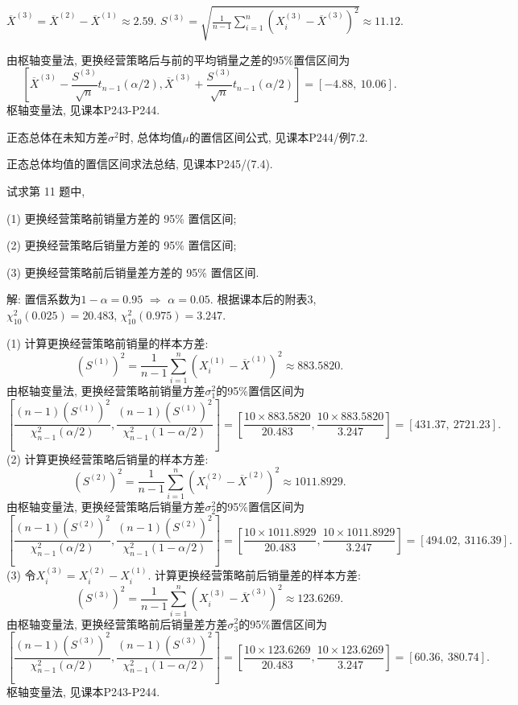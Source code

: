 \documentclass[standard]{ExBook}
\renewenvironment{shaded}{%
  \def\FrameCommand{\fboxsep=\FrameSep \colorbox{shadecolor}}%
  \MakeFramed{\advance\hsize-\width \FrameRestore}%
}{%
  \endMakeFramed
}
\begin{document}
\begin{qitems}
$\overline{X}^{(3)}=\overline{X}^{(2)}-\overline{X}^{(1)}\approx2.59$. 
$S^{(3)}=\sqrt{\frac{1}{n-1}\sum_{i=1}^n(X_i^{(3)}-\overline{X}^{(3)})^2}\approx11.12$.

由枢轴变量法, 更换经营策略后与前的平均销量之差的95\%置信区间为
$$
\left[
\overline{X}^{(3)}-\frac{S^{(3)}}{\sqrt{n}}t_{n-1}(\alpha/2),
\overline{X}^{(3)}+\frac{S^{(3)}}{\sqrt{n}}t_{n-1}(\alpha/2)
\right]
=
[-4.88,\ 10.06].
$$
\textcolor{themeColor}{\selectfont {} 枢轴变量法, 见课本P243-P244.}

\textcolor{themeColor}{\selectfont {}
正态总体在未知方差$\sigma^2$时, 总体均值$\mu$的置信区间公式, 见课本P244/例7.2.}

\textcolor{themeColor}{\selectfont {} 正态总体均值的置信区间求法总结, 见课本P245/(7.4).}

\vspace{2.5cm-5em}

    \begin{bbox}
    \begin{shaded}
        \qitem
试求第 11 题中,

(1) 更换经营策略前销量方差的 95\% 置信区间;

(2) 更换经营策略后销量方差的 95\% 置信区间;

(3) 更换经营策略前后销量差方差的 95\% 置信区间.
    \end{shaded}
    \end{bbox}

\vspace{\dimexpr2.5cm-5em\relax}

解: 置信系数为$1-\alpha=0.95$ $\Longrightarrow$ $\alpha=0.05$. 根据课本后的附表3,
$\chi_{10}^2(0.025)=20.483$, $\chi_{10}^2(0.975)=3.247$.

(1) 计算更换经营策略前销量的样本方差:
$$
\left(S^{(1)}\right)^2
=
\frac{1}{n-1}\sum_{i=1}^n
\left(X_i^{(1)}-\overline{X}^{(1)}\right)^2
\approx883.5820.
$$
由枢轴变量法, 更换经营策略前销量方差$\sigma_1^2$的95\%置信区间为
$$
\left[
\frac{(n-1)\left(S^{(1)}\right)^2}
{\chi_{n-1}^2(\alpha/2)},
\frac{(n-1)\left(S^{(1)}\right)^2}
{\chi_{n-1}^2(1-\alpha/2)}
\right]
=
\left[
\frac{10\times883.5820}{20.483},
\frac{10\times883.5820}{3.247}
\right]
=
[431.37,\ 2721.23].
$$
(2) 计算更换经营策略后销量的样本方差:
$$
\left(S^{(2)}\right)^2
=
\frac{1}{n-1}\sum_{i=1}^n
\left(X_i^{(2)}-\overline{X}^{(2)}\right)^2
\approx1011.8929.
$$
由枢轴变量法, 更换经营策略后销量方差$\sigma_2^2$的95\%置信区间为
$$
\left[
\frac{(n-1)\left(S^{(2)}\right)^2}
{\chi_{n-1}^2(\alpha/2)},
\frac{(n-1)\left(S^{(2)}\right)^2}
{\chi_{n-1}^2(1-\alpha/2)}
\right]
=
\left[
\frac{10\times1011.8929}{20.483},
\frac{10\times1011.8929}{3.247}
\right]
=
[494.02,\ 3116.39].
$$
(3) 令$X_i^{(3)}=X_i^{(2)}-X_i^{(1)}$. 计算更换经营策略前后销量差的样本方差:
$$
\left(S^{(3)}\right)^2
=
\frac{1}{n-1}\sum_{i=1}^n
\left(X_i^{(3)}-\overline{X}^{(3)}\right)^2
\approx123.6269.
$$
由枢轴变量法, 更换经营策略前后销量差方差$\sigma_3^2$的95\%置信区间为
$$
\left[
\frac{(n-1)\left(S^{(3)}\right)^2}
{\chi_{n-1}^2(\alpha/2)},
\frac{(n-1)\left(S^{(3)}\right)^2}
{\chi_{n-1}^2(1-\alpha/2)}
\right]
=
\left[
\frac{10\times123.6269}{20.483},
\frac{10\times123.6269}{3.247}
\right]
=
[60.36,\ 380.74].
$$
\textcolor{themeColor}{\selectfont {} 枢轴变量法, 见课本P243-P244.}


\end{qitems}
\end{document}
